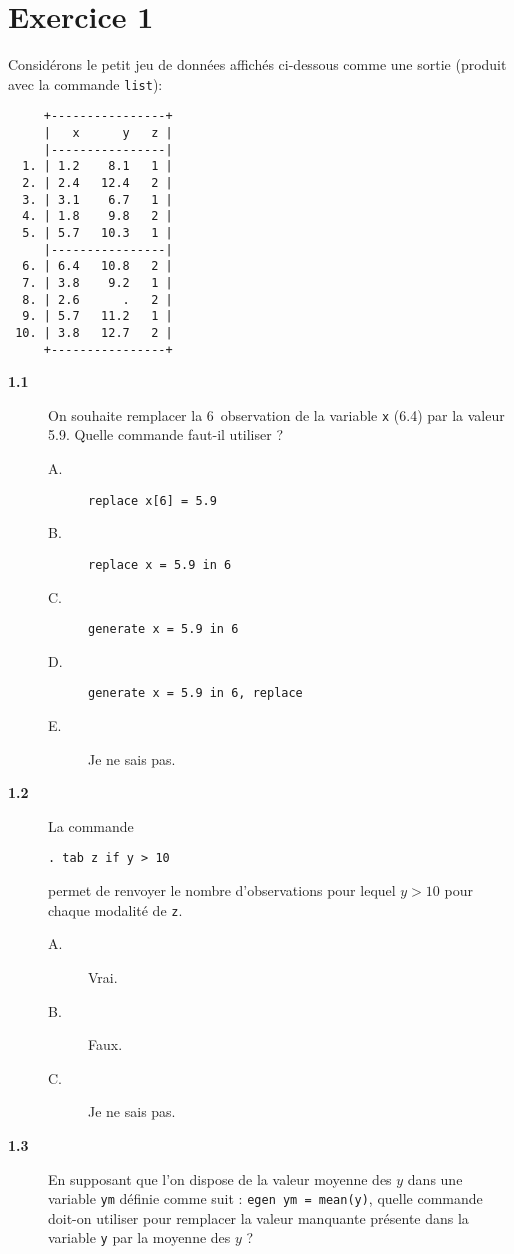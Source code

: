 \section*{Exercice 1}
Considérons le petit jeu de données affichés ci-dessous comme une sortie
\Stata (produit avec la commande \verb|list|):
\begin{verbatim}
     +----------------+
     |   x      y   z |
     |----------------|
  1. | 1.2    8.1   1 |
  2. | 2.4   12.4   2 |
  3. | 3.1    6.7   1 |
  4. | 1.8    9.8   2 |
  5. | 5.7   10.3   1 |
     |----------------|
  6. | 6.4   10.8   2 |
  7. | 3.8    9.2   1 |
  8. | 2.6      .   2 |
  9. | 5.7   11.2   1 |
 10. | 3.8   12.7   2 |
     +----------------+
\end{verbatim}
\begin{description}
\item[\bf 1.1] On souhaite remplacer la 6\ieme\ observation de la variable
  \texttt{x} (6.4) par la valeur 5.9. Quelle commande faut-il utiliser ?
  \begin{description}
  \item[A.] \verb|replace x[6] = 5.9|
  \item[B.] \verb|replace x = 5.9 in 6|
  \item[C.] \verb|generate x = 5.9 in 6|
  \item[D.] \verb|generate x = 5.9 in 6, replace|
  \item[E.] Je ne sais pas.
  \end{description}  
\item[\bf 1.2] La commande
\begin{verbatim}
. tab z if y > 10
\end{verbatim}
permet de renvoyer le nombre d'observations pour lequel $y > 10$ pour chaque
modalité de \texttt{z}. 
  \begin{description}
  \item[A.] Vrai.
  \item[B.] Faux.
  \item[C.] Je ne sais pas.
  \end{description}  
\item[\bf 1.3] En supposant que l'on dispose de la valeur moyenne des $y$
  dans une variable \texttt{ym} définie comme suit :
  \verb|egen ym = mean(y)|, quelle commande doit-on utiliser pour remplacer
  la valeur manquante présente dans la variable \texttt{y} par la moyenne
  des $y$ ?  
  \begin{description}

\end{description}
\end{description}

